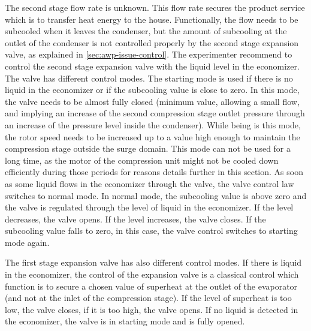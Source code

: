The second stage flow rate is unknown. This flow rate secures the
product service which is to transfer heat energy to the
house. Functionally, the flow needs to be subcooled when it leaves the
condenser, but the amount of subcooling at the outlet of the condenser
is not controlled properly by the second stage expansion valve, as
explained in \cref{sec:awp-issue-control}. The experimenter recommend
to control the second stage expansion valve with the liquid level in
the economizer. The valve has different control modes. The starting
mode is used if there is no liquid in the economizer or if the
subcooling value is close to zero. In this mode, the valve needs to be
almost fully closed (minimum value, allowing a small flow, and
implying an increase of the second compression stage outlet pressure
through an increase of the pressure level inside the condenser). While
being is this mode, the rotor speed needs to be increased up to a
value high enough to maintain the compression stage outside the surge
domain. This mode can not be used for a long time, as the motor of the
compression unit might not be cooled down efficiently during those
periods for reasons details further in this section. As soon as some
liquid flows in the economizer through the valve, the valve control
law switches to normal mode. In normal mode, the subcooling value is
above zero and the valve is regulated through the level of liquid in
the economizer. If the level decreases, the valve opens. If the level
increases, the valve closes. If the subcooling value falls to zero, in
this case, the valve control switches to starting mode again.

The first stage expansion valve has also different control modes. If
there is liquid in the economizer, the control of the expansion valve
is a classical control which function is to secure a chosen value of
superheat at the outlet of the evaporator (and not at the inlet of the
compression stage). If the level of superheat is too low, the valve
closes, if it is too high, the valve opens. If no liquid is detected
in the economizer, the valve is in starting mode and is fully opened.

